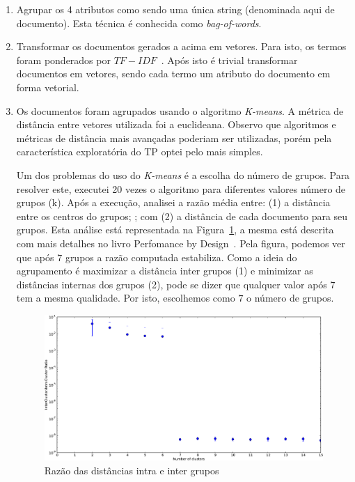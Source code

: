 \documentclass[brazil,a4paper,12pt]{article}
\begin{document}
\begin{enumerate}

\item Agrupar os 4 atributos como sendo uma única string (denominada aqui de documento). Esta técnica é conhecida como \emph{bag-of-words}.

\item Transformar os documentos gerados a acima em vetores. Para isto, os termos foram ponderados por $TF-IDF$~\cite{baeza2010modern}. Após isto é trivial transformar documentos em vetores, sendo cada termo um atributo do documento em forma vetorial.

\item Os documentos foram agrupados usando o algoritmo \emph{K-means}. A métrica de distância entre vetores utilizada foi a euclideana. Observo que algoritmos e métricas de distância mais avançadas poderiam ser utilizadas, porém pela característica exploratória do TP optei pelo mais simples. 

Um dos problemas do uso do \emph{K-means} é a escolha do número de grupos. Para resolver este, executei 20 vezes o algoritmo para diferentes valores número de grupos (k). Após a execução, analisei a razão média entre: (1) a distância entre os centros do grupos; ; com (2) a distância de cada documento para seu grupos. Esta análise está representada na Figura~\ref{fig:clust}, a mesma está descrita com mais detalhes no livro Perfomance by Design~\cite{menasce2004performance}. Pela figura, podemos ver que após $7$ grupos a razão computada estabiliza. Como a ideia do agrupamento é maximizar a distância inter grupos (1) e minimizar as distâncias internas dos grupos (2), pode se dizer que qualquer valor após $7$ tem a mesma qualidade. Por isto, escolhemos como $7$ o número de grupos.

\begin{figure}
\centering
\includegraphics[scale=0.4]{clust-crop.pdf}
\caption{Razão das distâncias intra e inter grupos}
\label{fig:clust}
\end{figure}

\end{enumerate}
\end{document}
